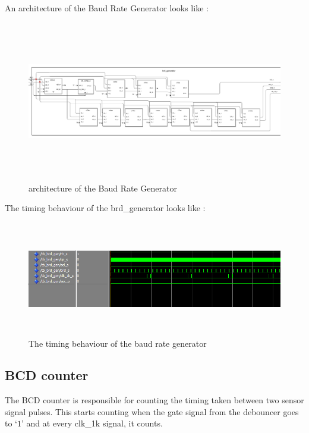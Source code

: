 \documentclass[12pt,a4paper]{article}
\begin{document}
An architecture of the Baud Rate Generator looks like :\\
\begin{figure}[H]
\centering
\includegraphics[width=16cm,height=7cm]{badGeneratorArc.PNG}
\caption{architecture of the Baud Rate Generator}
\label{architecture of the Baud Rate Generator}
\end{figure}

The timing behaviour of the brd\_generator looks like :\\
\begin{figure}[H]
\centering
\includegraphics[width=16cm,height=5cm]{BaudRate.PNG}
\caption{The timing behaviour of the baud rate generator}
\label{the timing behaviour of the brd Generator}
\end{figure}

\subsection{BCD counter}
The BCD counter is responsible for counting the timing taken between two sensor signal pulses. This starts counting when the gate signal from the debouncer goes to ‘$1$’ and at every clk\_1k signal, it counts. \\
\end{document}
